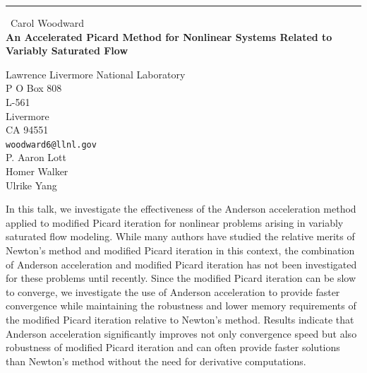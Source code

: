\documentclass{report}
\begin{document}
\begin{center}
\rule{6in}{1pt} \
{\large Carol Woodward \\
{\bf An Accelerated Picard Method for Nonlinear Systems Related to Variably Saturated Flow}}

Lawrence Livermore National Laboratory \\ P O Box 808 \\ L-561 \\ Livermore \\ CA 94551
\\
{\tt woodward6@llnl.gov}\\
P. Aaron Lott\\
Homer Walker\\
Ulrike Yang\end{center}

In this talk, we investigate the effectiveness of the Anderson
acceleration method applied to modified Picard iteration for nonlinear
problems arising in variably saturated flow modeling. While many authors
have studied the relative merits of Newton's method and modified Picard
iteration in this context, the combination of Anderson acceleration and
modified Picard iteration has not been investigated for these problems
until recently. Since the modified Picard iteration can be slow to
converge, we investigate the use of Anderson acceleration to provide
faster convergence while maintaining the robustness and lower memory
requirements of the modified Picard iteration relative to Newton's
method. Results indicate that Anderson acceleration significantly
improves not only convergence speed but also robustness of modified
Picard iteration and can often provide faster solutions than Newton's
method without the need for derivative computations.
\end{document}
